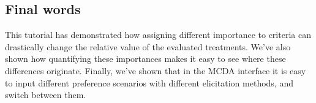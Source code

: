 \documentclass[00_mcda_tutorial.tex]{subfiles}
\begin{document}
\subsection*{Final words}
This tutorial has demonstrated how assigning different importance to criteria can drastically change the relative value of the evaluated treatments. We’ve also shown how quantifying these importances makes it easy to see where these differences originate. Finally, we’ve shown that in the MCDA interface it is easy to input different preference scenarios with different elicitation methods, and switch between them.
\end{document}
